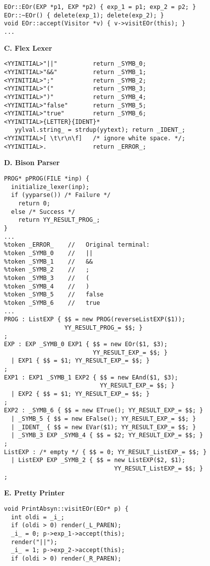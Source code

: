 \begin{figure}
\begin{boxedminipage}[t]{\textwidth}
\begin{minipage}[l]{0.5\textwidth}
\begin{verbatim}
EOr::EOr(EXP *p1, EXP *p2) { exp_1 = p1; exp_2 = p2; }
EOr::~EOr() { delete(exp_1); delete(exp_2); }
void EOr::accept(Visitor *v) { v->visitEOr(this); }
...
\end{verbatim}
\normalsize
\textbf{C. Flex Lexer}
\scriptsize
\begin{verbatim}
<YYINITIAL>"||"          return _SYMB_0;
<YYINITIAL>"&&"          return _SYMB_1;
<YYINITIAL>";"           return _SYMB_2;
<YYINITIAL>"("           return _SYMB_3;
<YYINITIAL>")"           return _SYMB_4;
<YYINITIAL>"false"       return _SYMB_5;
<YYINITIAL>"true"        return _SYMB_6;
<YYINITIAL>{LETTER}{IDENT}*
   yylval.string_ = strdup(yytext); return _IDENT_;
<YYINITIAL>[ \t\r\n\f]   /* ignore white space. */;
<YYINITIAL>.             return _ERROR_;
\end{verbatim}
\normalsize
\end{minipage}
\hfill
\begin{minipage}[r]{0.5\textwidth}
\textbf{D. Bison Parser}
\scriptsize
\begin{verbatim}
PROG* pPROG(FILE *inp) {
  initialize_lexer(inp);
  if (yyparse()) /* Failure */
    return 0;
  else /* Success */
    return YY_RESULT_PROG_;
}
...
%token _ERROR_    //   Original terminal:
%token _SYMB_0    //   ||
%token _SYMB_1    //   &&
%token _SYMB_2    //   ;
%token _SYMB_3    //   (
%token _SYMB_4    //   )
%token _SYMB_5    //   false
%token _SYMB_6    //   true
...
PROG : ListEXP { $$ = new PROG(reverseListEXP($1));
                 YY_RESULT_PROG_= $$; } 
;
EXP : EXP _SYMB_0 EXP1 { $$ = new EOr($1, $3);
                         YY_RESULT_EXP_= $$; } 
  | EXP1 { $$ = $1; YY_RESULT_EXP_= $$; }
;
EXP1 : EXP1 _SYMB_1 EXP2 { $$ = new EAnd($1, $3);
                           YY_RESULT_EXP_= $$; } 
  | EXP2 { $$ = $1; YY_RESULT_EXP_= $$; }
;
EXP2 : _SYMB_6 { $$ = new ETrue(); YY_RESULT_EXP_= $$; } 
  | _SYMB_5 { $$ = new EFalse(); YY_RESULT_EXP_= $$; }
  | _IDENT_ { $$ = new EVar($1); YY_RESULT_EXP_= $$; }
  | _SYMB_3 EXP _SYMB_4 { $$ = $2; YY_RESULT_EXP_= $$; }
;
ListEXP : /* empty */ { $$ = 0; YY_RESULT_ListEXP_= $$; } 
  | ListEXP EXP _SYMB_2 { $$ = new ListEXP($2, $1);
                               YY_RESULT_ListEXP_= $$; }
;
\end{verbatim}
\normalsize
\textbf{E. Pretty Printer}
\scriptsize
\begin{verbatim}
void PrintAbsyn::visitEOr(EOr* p) {
  int oldi = _i_;
  if (oldi > 0) render(_L_PAREN);
  _i_ = 0; p->exp_1->accept(this);
  render("||");
  _i_ = 1; p->exp_2->accept(this);
  if (oldi > 0) render(_R_PAREN);

\end{verbatim}
\end{minipage}
\end{boxedminipage}
\end{figure}

